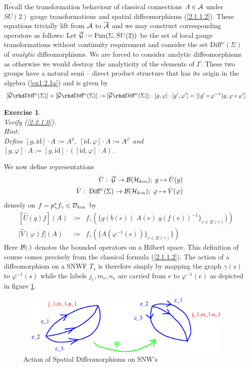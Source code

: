 \documentclass[12pt]{report}
\newtheorem{Exercise}{Exercise}[section]
\def\be{\begin{equation}}
\def\ee{\end{equation}}
\def\ba{\begin{eqnarray}}
\def\ea{\end{eqnarray}}
\def\a{{\cal A}}
\def\ab{\overline{\a}}
\begin{document}
Recall the transformation behaviour of classical connections $A\in\a$ 
under $SU(2)$ gauge transformations and spatial diffeomorphisms
(\ref{2.1.1.2}). These equations trivially lift from $\a$ to $\ab$
and we may construct corresponding operators as follows: Let 
$\overline{{\cal G}}:=\mbox{Fun}(\Sigma,SU(2))$ be the set of local 
gauge transformations without continuity requirement and consider the set
$\mbox{Diff}^\omega(\Sigma)$ of {\it analytic} diffeomorphisms. We are 
forced to consider analytic diffeomorphisms as otherwise we would destroy 
the analyticity of the elements of $\Gamma$. These two groups have a natural
semi -- direct product structure that has its origin in the algebra 
(\ref{ex1.2.1a}) and is given by
\be \label{2.2.1.0}
[\overline{{\cal G}}\rhd \mbox{Diff}^\omega(\Sigma)]\times
[\overline{{\cal G}}\rhd \mbox{Diff}^\omega(\Sigma)]\to
[\overline{{\cal G}}\rhd \mbox{Diff}^\omega(\Sigma)];\;\;
[g,\varphi]\cdot[g',\varphi']=[(g'\circ\varphi^{-1})g,\varphi\circ\varphi']
\ee
%
\begin{Exercise} \label{ex2.2.1.1}  ~~~~\\
Verify (\ref{2.2.1.0}).\\
Hint:\\
Define $[g,\mbox{id}]\cdot A:=A^g,\;[\mbox{id},\varphi]\cdot A:=A^\varphi$
and $[g,\varphi]\cdot A:=[g,\mbox{id}]\cdot([\mbox{id},\varphi]\cdot A)$.
\end{Exercise}
%
We now define representations 
\ba \label{2.2.1.1}
&& \hat{U}:\;\overline{{\cal G}}\to {\cal B}({\cal H}_{kin});\;
g\mapsto \hat{U}(g) \nonumber\\
&& \hat{V}:\;\mbox{Diff}^\omega(\Sigma)\to {\cal B}({\cal H}_{kin});\;
\varphi\mapsto \hat{V}(\varphi)
\ea
densely on $f=p_\gamma^\ast f_\gamma\in {\cal D}_{kin}$ by
\ba \label{2.2.1.2}
[\hat{U}(g) f](A) &:=& 
f_\gamma(\{g(b(e))\;A(e)\;g(f(e))^{-1}\}_{e\in E(\gamma)}\})
\nonumber\\
{[}\hat{V}(\varphi) f](A) &:=& 
f_\gamma(\{A(\varphi^{-1}(e))\}_{e\in E(\gamma)}\})
\ea
Here ${\cal B}(.)$ denotes the bounded operators on a Hilbert space.
This definition of course comes precisely from the classical formula
(\ref{2.1.1.2}). The action of a diffeomorphism on a SNWF $T_s$ is therefore 
simply by mapping the graph $\gamma(s)$ to $\varphi^{-1}(s)$ while the 
labels $j_e,m_e,n_e$ are carried from $e$ to $\varphi^{-1}(e)$ as 
depicted in figure \ref{f9}. 
%
\begin{figure} 
\includegraphics[width=14cm,height=3cm]{proc9fig9.ps}
\caption{Action of Spatial Diffeomorphisms on SNW's}
\label{f9}
\end{figure}
\end{document}
